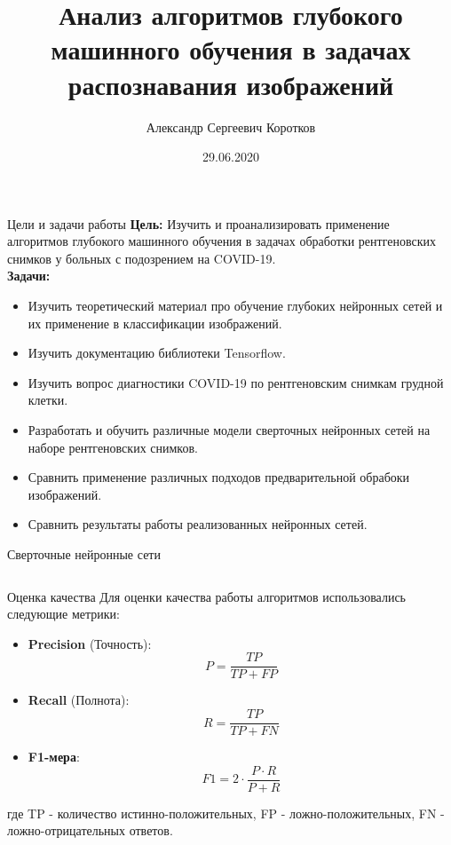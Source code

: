 \documentclass[aspectratio=169]{beamer}
\title{Анализ алгоритмов глубокого машинного обучения  в задачах распознавания изображений}
\author[Коротков А.С.]{Александр Сергеевич Коротков}
\institute[]{Научный руководитель: Д.В. Матвеев}
\date{29.06.2020}
\begin{document}
\maketitle
\begin{frame}{Цели и задачи работы}
    \textbf{Цель:} Изучить и проанализировать применение алгоритмов глубокого машинного обучения  в задачах обработки рентгеновских снимков у больных с подозрением на COVID-19. \\
    \textbf{Задачи: }
    \begin{itemize}
        \item Изучить теоретический материал про обучение глубоких нейронных сетей и их применение в классификации изображений.
        \item Изучить документацию библиотеки Tensorflow.
        \item Изучить вопрос диагностики COVID-19 по рентгеновским снимкам грудной клетки.
        \item Разработать и обучить различные модели сверточных нейронных сетей на наборе рентгеновских снимков.
        \item Сравнить применение различных подходов предварительной обрабоки изображений.
        \item Сравнить результаты работы реализованных нейронных сетей.
    \end{itemize}
\end{frame}

\begin{frame}{Сверточные нейронные сети}
    \begin{columns}[T]
        \begin{column}{.4\paperwidth}
            \centering
                
        \end{column}
        \begin{column}{.5\paperwidth}
            
        \end{column}
    \end{columns}   
\end{frame}

\begin{frame}{Оценка качества}
    Для оценки качества работы алгоритмов использовались следующие метрики:
    \begin{itemize}
        \item \textbf{Precision} (Точность): \[P = \frac{TP}{TP+FP}\]
        \item \textbf{Recall} (Полнота): \[R=\frac{TP}{TP+FN}\] 
        \item \textbf{F1-мера}: \[F1=2 \cdot \frac{P \cdot R}{P+R}\] 
    \end{itemize}    
    где TP - количество истинно-положительных,
    FP - ложно-положительных, 
    FN - ложно-отрицательных ответов.
\end{frame}
\end{document}
